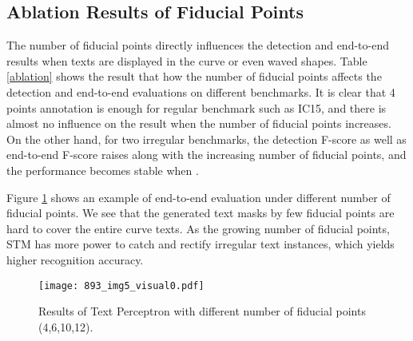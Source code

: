 \documentclass[letterpaper]{article} \usepackage{aaai20}  \usepackage{times}  \usepackage{helvet} \usepackage{courier}  \usepackage[hyphens]{url}  \usepackage{graphicx} \urlstyle{rm} \def\UrlFont{\rm}  \usepackage{graphicx}  \frenchspacing  \setlength{\pdfpagewidth}{8.5in}  \setlength{\pdfpageheight}{11in}  \usepackage{amsmath}
\begin{document}
\subsection{Ablation Results of Fiducial Points}
The number of fiducial points directly influences the detection and end-to-end results when texts are displayed in the curve or even waved shapes. Table \ref{ablation} shows the result that how the number of  fiducial points affects the detection and end-to-end evaluations on different benchmarks.
It is clear that 4 points annotation is enough for regular benchmark such as IC15, and there is almost no influence on the result when the number of fiducial points increases.
On the other hand, for two irregular benchmarks, the detection F-score as well as end-to-end F-score raises along with the increasing number of fiducial points, and the performance becomes stable when .
\begin{table}
\centering
{}
\caption{Detection (top part) and end-to-end (bottom part) evaluation (F-measure) under varied number of fiducial points for different benchmarks.}
\label{ablation}
\end{table}

Figure \ref{points} shows an example of end-to-end evaluation under different number of fiducial points. We see that the generated text masks by few fiducial points are hard to cover the entire curve texts. As the growing number of fiducial points, STM has more power to catch and rectify irregular text instances, which yields higher recognition accuracy.
\begin{figure}[t]
\centering
\texttt{[image: 893\_img5\_visual0.pdf]}\\
\caption{Results of Text Perceptron with different number of fiducial points (4,6,10,12).}
\label{points}
\end{figure}
\end{document}
